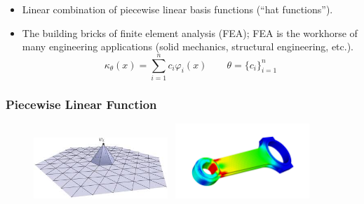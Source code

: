 \documentclass{beamer}
\begin{document}
\begin{frame}

\begin{itemize}
	\item Linear combination of piecewise linear basis functions (``hat functions''). 
	\item The building bricks of finite element analysis (FEA); FEA is the workhorse of many engineering applications (solid mechanics, structural engineering, etc.). 
	$$\kappa_{\theta}(x) = \sum_{i=1}^n c_i\varphi_i(x)\qquad \theta = \{c_i\}_{i=1}^n$$
\end{itemize}

\frametitle{Piecewise Linear Function}
\begin{figure}[hbt]
  \includegraphics[width=0.45\textwidth]{figures/fe}~
  \includegraphics[width=0.45\textwidth]{figures/feapp}
\end{figure}

\end{frame}
\end{document}

